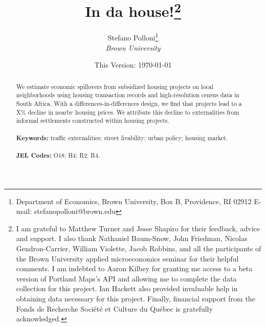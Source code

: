 \documentclass[12pt]{article}
\begin{document}
\begin{titlepage}
\title{In da house!\thanks{I am grateful to Matthew Turner and Jesse Shapiro for their feedback, advice and support. I also thank Nathaniel Baum-Snow, John Friedman, Nicolas Gendron-Carrier, William Violette, Jacob Robbins, and all the participants of the Brown University applied microeconomics seminar for their helpful comments. I am indebted to Aaron Kilbey for granting me access to a beta version of Portland Maps's API and allowing me to complete the data collection for this project. Ian Hackett also provided invaluable help in obtaining data necessary for this project. Finally, financial support from the Fonds de Recherche Soci\'et\'e et Culture du Qu\'ebec is gratefully acknowledged.}}
\vspace{2mm}
\author{Stefano Polloni\thanks{Department of Economics, Brown University, Box B, Providence, RI 02912  E-mail: stefano\textunderscore polloni@brown.edu}\\[-0.4em] \normalsize{\it Brown University}\\}
\vspace{30mm}
\date{\vspace{5mm}This Version: \today}
\maketitle
\begin{abstract}
\noindent We estimate economic spillovers from subsidized housing projects on local neighborhoods using housing transaction records and high-resolution census data in South Africa.  With a differences-in-differences design, we find that projects lead to a X\% decline in nearby housing prices.  We attribute this decline to externalities from informal settlements constructed within housing projects.   \\
\vspace{0in}\\
\noindent\textbf{Keywords:} traffic externalities; street livability; urban policy; housing market.\\
\vspace{0in}\\
\noindent\textbf{JEL Codes:} O18; H4; R2; R4.\\

\bigskip
\end{abstract}
\setcounter{page}{0}
\thispagestyle{empty}
\end{titlepage}
\pagebreak \newpage

\doublespacing
\end{document}

